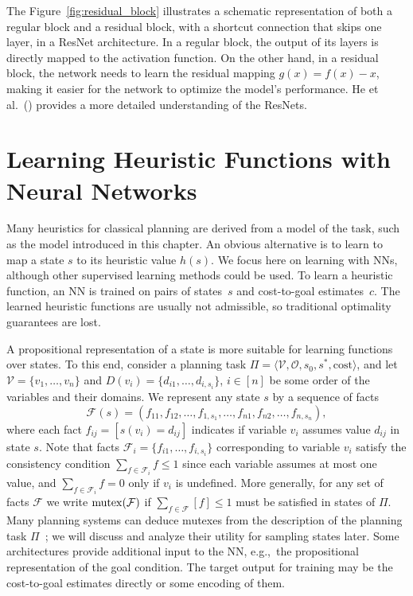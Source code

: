 The Figure~\ref{fig:residual_block} illustrates a schematic representation of both a regular block and a residual block, with a shortcut connection that skips one layer, in a ResNet architecture. In a regular block, the output of its layers is directly mapped to the activation function. On the other hand, in a residual block, the network needs to learn the residual mapping $g(x)=f(x)-x$, making it easier for the network to optimize the model's performance. He et al.~(\citeyear{He.etal/2016}) provides a more detailed understanding of the ResNets.

\section{Learning Heuristic Functions with Neural Networks}
\label{sec:background_learningheuristics}

Many heuristics for classical planning are derived from a model of the task, such as the \sas model introduced in this chapter. An obvious alternative is to learn to map a state $s$ to its heuristic value $h(s)$. We focus here on learning with NNs, although other supervised learning methods could be used. To learn a heuristic function, an NN is trained on pairs of states~$s$ and cost-to-goal estimates~$c$. The learned heuristic functions are usually not admissible, so traditional optimality guarantees are lost.

A propositional representation of a state is more suitable for learning functions over states. To this end, consider a planning task $\Pi=\langle\mathcal{V},\mathcal{O},s_0,s^*, \text{cost}\rangle$, and let $\mathcal{V}=\{v_1,\ldots,v_n\}$ and $D(v_i)=\{d_{i1},\ldots,d_{i,s_i}\}$, $i\in[n]$ be some order of the variables and their domains. We represent any state $s$ by a sequence of facts $$\mathcal{F}(s)=(f_{11},f_{12},\ldots,f_{1,s_1},\ldots,f_{n1},f_{n2},\ldots,f_{n,s_n}),$$ where each fact $f_{ij}=[s(v_i)=d_{ij}]$ indicates if variable $v_i$ assumes value $d_{ij}$ in state $s$. Note that facts $\mathcal{F}_i=\{f_{i1},\ldots,f_{i,s_i}\}$ corresponding to variable $v_i$ satisfy the consistency condition $\sum_{f\in \mathcal{F}_i} f\leq 1$ since each variable assumes at most one value, and $\sum_{f\in \mathcal{F}_i} f=0$ only if $v_i$ is undefined. More generally, for any set of facts $\mathcal{F}$ we write $\operatorname{mutex}(\mathcal{F})$ if $\sum_{f\in \mathcal{F}} [f]\leq 1$ must be satisfied in states of $\Pi$. Many planning systems can deduce mutexes from the description of the planning task $\Pi$~\cite{Helmert/2009}; we will discuss and analyze their utility for sampling states later. Some architectures provide additional input to the NN, e.g.,~the propositional representation of the goal condition. The target output for training may be the cost-to-goal estimates directly or some encoding of them.

